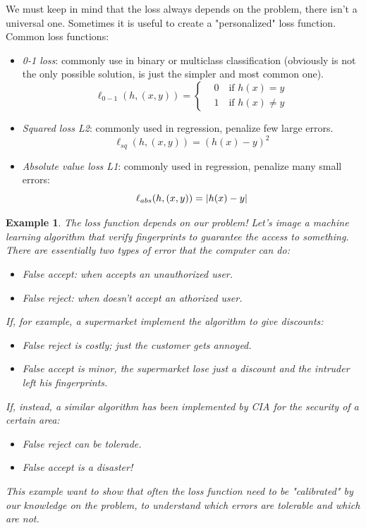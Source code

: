 \documentclass[12pt]{report}
\theoremstyle{plain}
\newtheorem{EX}{Example}
\begin{document}
\begin{flushleft}
We must keep in mind that the loss always depends on the problem, there isn't a universal one. Sometimes it is useful to create a "personalized" loss function.\\
Common loss functions:
\begin{itemize}
\item \textit{0-1 loss}: commonly use in binary or multiclass classification (obviously is not the only possible solution, is just the simpler and most common one).
\[ \ell_{0-1}(h,(x,y))=\left\{\begin{aligned} &0\quad\text{if  }h(x)=y\\ &1\quad\text{if  }h(x)\neq y\end{aligned}\right. \]
\item \textit{Squared loss L2}: commonly used in regression, penalize few large errors.
\[ \ell_{sq}(h,(x,y))=(h(x)-y)^2 \]
\item \textit{Absolute value loss L1}: commonly used in regression, penalize many small errors:
\[ \ell_{abs}(h,(x,y))=\abs{h(x)-y} \]
\end{itemize}

\begin{EX} The loss function depends on our problem!
Let's image a machine learning algorithm that verify fingerprints to guarantee the access to something. There are essentially two types of error that the computer can do:
\begin{itemize}
\item \textit{False accept}: when accepts an unauthorized user.
\item \textit{False reject}: when doesn't accept an athorized user.
\end{itemize}
If, for example, a supermarket implement the algorithm to give discounts:
\begin{itemize}
\item[-] False reject is costly; just the customer gets annoyed.
\item[-] False accept is minor, the supermarket lose just a discount and the intruder left his fingerprints.
\end{itemize}
If, instead, a similar algorithm has been implemented by CIA for the security of a certain area:
\begin{itemize}
\item[-] False reject can be tolerade.
\item[-] False accept is a disaster!
\end{itemize}
This example want to show that often the loss function need to be "calibrated" by our knowledge on the problem, to understand which errors are tolerable and which are not.
\end{EX}


\end{flushleft}
\end{document}
